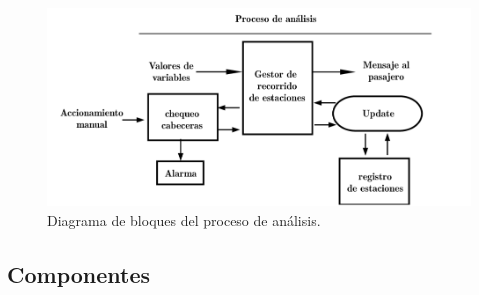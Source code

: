 \documentclass[
11pt, %
]{charter}
\begin{document}
\begin{figure}[htpb]
\centering 
\includegraphics[width=1\textwidth]{./Pics/procesoAnalisis.png}
\caption{Diagrama de bloques del proceso de análisis.}
\label{fig:pattern3}
\end{figure}



\subsection{Componentes}
\end{document}
